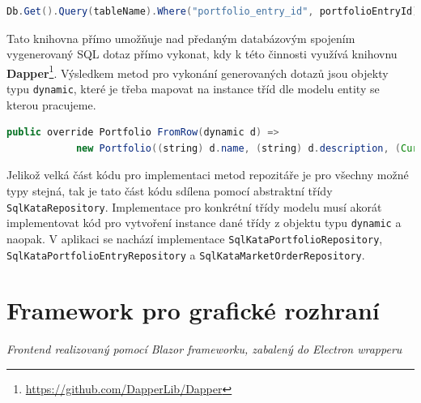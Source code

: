 \documentclass[12pt, a4paper]{article}
\let\oldsection\section
\renewcommand\section{\clearpage\oldsection}
\begin{document}
\begin{lstlisting}[language=Java, caption={Příklad generování SQL dotazu pro výběr všech transakcí dané položky portfólia pomocí knihovny SqlKata Query Builder.},captionpos=b, label={lst:sm-showcase}]
Db.Get().Query(tableName).Where("portfolio_entry_id", portfolioEntryId).Get()
\end{lstlisting}

Tato knihovna přímo umožňuje nad předaným databázovým spojením vygenerovaný SQL dotaz přímo vykonat, kdy k této činnosti využívá knihovnu \textbf{Dapper}\footnote{\url{https://github.com/DapperLib/Dapper}}. Výsledkem metod pro vykonání generovaných dotazů jsou objekty typu \texttt{dynamic}, které je třeba mapovat na instance tříd dle modelu entity se kterou pracujeme.

\begin{lstlisting}[language=Java,caption={Příklad mapování objektu typu \texttt{dynamic} na instanci třídy \texttt{Portfolio}.},captionpos=b, label={lst:sm-mapping}]
public override Portfolio FromRow(dynamic d) =>
            new Portfolio((string) d.name, (string) d.description, (Currency) d.currency_code, (int) d.id);
\end{lstlisting}

Jelikož velká část kódu pro implementaci metod repozitáře je pro všechny možné typy stejná, tak je tato část kódu sdílena pomocí abstraktní třídy \texttt{SqlKataRepository}. Implementace pro konkrétní třídy modelu musí akorát implementovat kód pro vytvoření instance dané třídy z objektu typu \texttt{dynamic} a naopak. V aplikaci se nachází implementace \texttt{SqlKataPortfolioRepository}, \texttt{SqlKataPortfolioEntryRepository} a \texttt{SqlKataMarketOrderRepository}.

\section{Framework pro grafické rozhraní}
\textit{Frontend realizovaný pomocí Blazor frameworku, zabalený do Electron wrapperu}



\printbibliography
\end{document}
